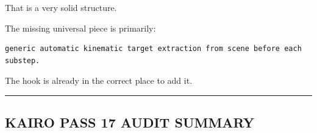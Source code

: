 That is a very solid structure.

The missing universal piece is primarily:

\begin{verbatim}
generic automatic kinematic target extraction from scene before each substep.
\end{verbatim}

The hook is already in the correct place to add it.

\begin{center}\rule{0.5\linewidth}{0.5pt}\end{center}

\subsection{KAIRO PASS 17 AUDIT SUMMARY}\label{06-engine-ii-ch038-kairo-pass-17-audit-summary}

\hypertarget{06-engine-ii-ch038-kairo-pass-17-audit-summary}{}

